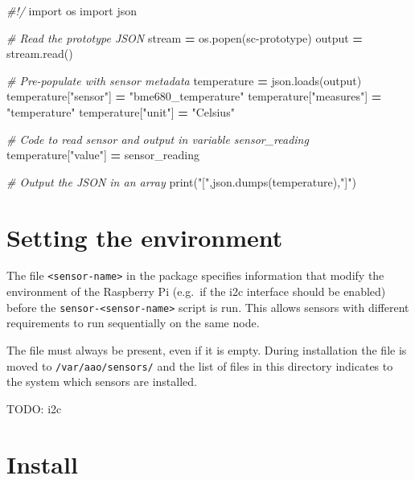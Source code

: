 \documentclass[
]{book}
\newenvironment{Shaded}{\begin{snugshade}}{\end{snugshade}}
\newcommand{\BuiltInTok}[1]{#1}
\newcommand{\CommentTok}[1]{\textcolor[rgb]{0.56,0.35,0.01}{\textit{#1}}}
\newcommand{\ImportTok}[1]{#1}
\newcommand{\NormalTok}[1]{#1}
\newcommand{\OperatorTok}[1]{\textcolor[rgb]{0.81,0.36,0.00}{\textbf{#1}}}
\newcommand{\StringTok}[1]{\textcolor[rgb]{0.31,0.60,0.02}{#1}}
\begin{document}
\begin{Shaded}
\begin{Highlighting}[]
\CommentTok{\#!/}
\ImportTok{import}\NormalTok{ os}
\ImportTok{import}\NormalTok{ json}

\CommentTok{\# Read the prototype JSON}
\NormalTok{stream }\OperatorTok{=}\NormalTok{ os.popen(}\StringTok{\textquotesingle{}sc{-}prototype\textquotesingle{}}\NormalTok{)}
\NormalTok{output }\OperatorTok{=}\NormalTok{ stream.read()}

\CommentTok{\# Pre{-}populate with sensor metadata}
\NormalTok{temperature }\OperatorTok{=}\NormalTok{ json.loads(output)}
\NormalTok{temperature[}\StringTok{"sensor"}\NormalTok{] }\OperatorTok{=} \StringTok{"bme680\_temperature"}
\NormalTok{temperature[}\StringTok{"measures"}\NormalTok{] }\OperatorTok{=} \StringTok{"temperature"}
\NormalTok{temperature[}\StringTok{"unit"}\NormalTok{] }\OperatorTok{=} \StringTok{"Celsius"}

\CommentTok{\# Code to read sensor and output in variable \textasciigrave{}sensor\_reading\textasciigrave{}}
\NormalTok{temperature[}\StringTok{"value"}\NormalTok{] }\OperatorTok{=}\NormalTok{ sensor\_reading}

\CommentTok{\# Output the JSON in an array}
\BuiltInTok{print}\NormalTok{(}\StringTok{"["}\NormalTok{,json.dumps(temperature),}\StringTok{"]"}\NormalTok{)}
\end{Highlighting}
\end{Shaded}

\hypertarget{setting-the-environment}{%
\section{Setting the environment}\label{setting-the-environment}}

The file \texttt{\textless{}sensor-name\textgreater{}} in the package specifies information that modify the environment of the Raspberry Pi (e.g.~if the i2c interface should be enabled) before the \texttt{sensor-\textless{}sensor-name\textgreater{}} script is run. This allows sensors with different requirements to run sequentially on the same node.

The file must always be present, even if it is empty. During installation the file is moved to \texttt{/var/aao/sensors/} and the list of files in this directory indicates to the system which sensors are installed.

TODO: i2c

\hypertarget{install}{%
\section{Install}\label{install}}
\end{document}
